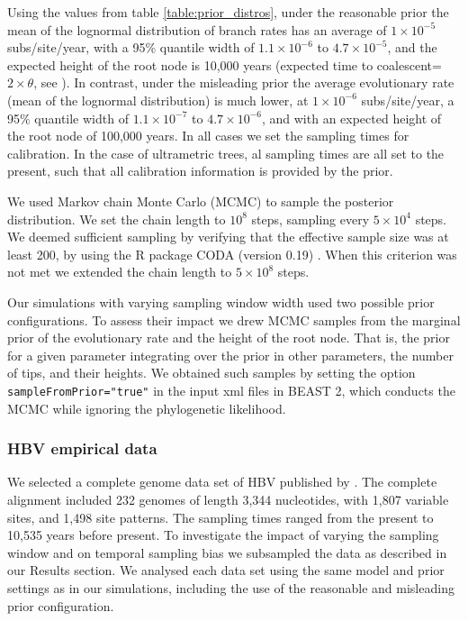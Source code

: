 \documentclass[11pt]{article}
\begin{document}
Using the values from table \ref{table:prior_distros}, under the reasonable prior the mean of the lognormal distribution of branch rates has an average of $1\times 10^{-5}$ subs/site/year, with a 95\% quantile width of $1.1\times 10^{-6}$ to $4.7\times10^{-5}$, and the expected height of the root node is 10,000 years (expected time to coalescent=$2\times \theta$, see \cite{nordborg2019coalescent}). In contrast, under the misleading prior the average evolutionary rate (mean of the lognormal distribution) is much lower, at $1\times10^{-6}$ subs/site/year, a 95\% quantile width of $1.1\times10^{-7}$ to $4.7\times10^{-6}$, and with an expected height of the root node of 100,000 years. In all cases we set the sampling times for calibration. In the case of ultrametric trees, al sampling times are all set to the present, such that all calibration information is provided by the prior.

We used Markov chain Monte Carlo (MCMC) to sample the posterior distribution. We set the chain length to $10^{8}$ steps, sampling every $5\times10^{4}$ steps. We deemed sufficient sampling by verifying that the effective sample size was at least 200, by using the R package CODA (version 0.19) \citep{plummer2006coda}. When this criterion was not met we extended the chain length to $5\times10^{8}$ steps. 

Our simulations with varying sampling window width used two possible prior configurations. To assess their impact we drew MCMC samples from the marginal prior of the evolutionary rate and the height of the root node. That is, the prior for a given parameter integrating over the prior in other parameters, the number of tips, and their heights. We obtained such samples by setting the option \texttt{sampleFromPrior="true"} in the input xml files in BEAST 2, which conducts the MCMC while ignoring the phylogenetic likelihood.

\subsubsection{HBV empirical data}
We selected a complete genome data set of HBV published by \cite{kocher2021ten}. The complete alignment included 232 genomes of length 3,344 nucleotides, with 1,807 variable sites, and 1,498 site patterns. The sampling times ranged from the present to 10,535 years before present. To investigate the impact of varying the sampling window and on temporal sampling bias we subsampled the data as described in our Results section. We analysed each data set using the same model and prior settings as in our simulations, including the use of the reasonable and misleading prior configuration.
\end{document}
